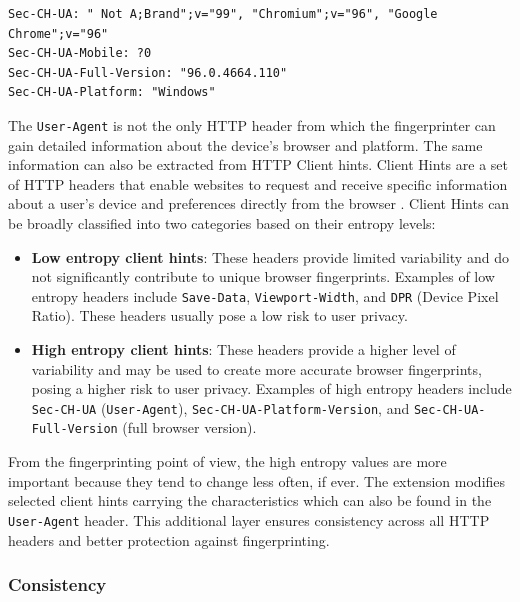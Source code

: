 \bigbreak

\begin{lstlisting}[caption={An example of HTTP Client hints \cite{MDN}.}, label={Listing:HTTPClientHintsExample}]
Sec-CH-UA: " Not A;Brand";v="99", "Chromium";v="96", "Google Chrome";v="96"
Sec-CH-UA-Mobile: ?0
Sec-CH-UA-Full-Version: "96.0.4664.110"
Sec-CH-UA-Platform: "Windows"
\end{lstlisting}

\medbreak

The \texttt{User-Agent} is not the only HTTP header from which the fingerprinter can gain detailed information about the device's browser and platform. The same information can also be extracted from HTTP Client hints. Client Hints are a set of HTTP headers that enable websites to request and receive specific information about a user's device and preferences directly from the browser \cite{MDN}. Client Hints can be broadly classified into two categories based on their entropy levels:

\begin{itemize}
	\item \textbf{Low entropy client hints}: These headers provide limited variability and do not significantly contribute to unique browser fingerprints. Examples of low entropy headers include \texttt{Save-Data}, \texttt{Viewport-Width}, and \texttt{DPR} (Device Pixel Ratio). These headers usually pose a low risk to user privacy.
	\item \textbf{High entropy client hints}: These headers provide a higher level of variability and may be used to create more accurate browser fingerprints, posing a higher risk to user privacy. Examples of high entropy headers include \texttt{Sec-CH-UA} (\texttt{User-Agent}), \texttt{Sec-CH-UA-Platform-Version}, and \texttt{Sec-CH-UA-Full-Version} (full browser version).
\end{itemize}

From the fingerprinting point of view, the high entropy values are more important because they tend to change less often, if ever. The extension modifies selected client hints carrying the characteristics which can also be found in the \texttt{User-Agent} header. This additional layer ensures consistency across all HTTP headers and better protection against fingerprinting.

\subsubsection{Consistency}

